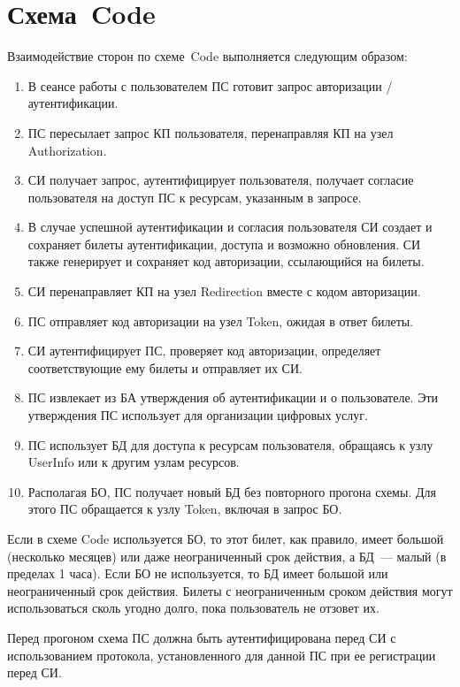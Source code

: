 \section{Схема~Code}\label{OIDC.Code}

Взаимодействие сторон по схеме~Code выполняется следующим образом:

\begin{enumerate}
\item 
В сеансе работы с пользователем ПС готовит запрос авторизации / аутентификации.

\item 
ПС пересылает запрос КП пользователя, перенаправляя КП на узел Authorization.

\item 
СИ получает запрос, аутентифицирует пользователя, получает согласие пользователя
на доступ ПС к ресурсам, указанным в запросе.

\item 
В случае успешной аутентификации и согласия пользователя СИ создает и сохраняет
билеты аутентификации, доступа и возможно обновления. СИ также генерирует и
сохраняет код авторизации, ссылающийся на билеты.

\item 
СИ перенаправляет КП на узел Redirection вместе с кодом авторизации.
 
\item 
ПС отправляет код авторизации на узел Token, ожидая в ответ билеты. 

\item 
СИ аутентифицирует ПС, проверяет код авторизации, определяет соответствующие ему
билеты и отправляет их СИ.

\item 
ПС извлекает из БА утверждения об аутентификации и о пользователе. Эти
утверждения ПС использует для организации цифровых услуг.

\item 
ПС использует БД для доступа к ресурсам пользователя,
обращаясь к узлу UserInfo или к другим узлам ресурсов. 

\item 
Располагая БО, ПС получает новый БД без повторного прогона схемы.
Для этого ПС обращается к узлу Token, включая в запрос БО. 
\end{enumerate}

Если в схеме Code используется БО, то этот билет, как правило, 
имеет большой (несколько месяцев) или даже неограниченный срок действия,
а БД~--- малый (в пределах 1 часа). 
%
Если БО не используется, то БД имеет большой или неограниченный срок 
действия. 
%
Билеты с неограниченным сроком действия могут использоваться сколь 
угодно долго, пока пользователь не отзовет их.

Перед прогоном схема ПС должна быть аутентифицирована перед СИ с использованием 
протокола, установленного для данной ПС при ее регистрации перед СИ.
